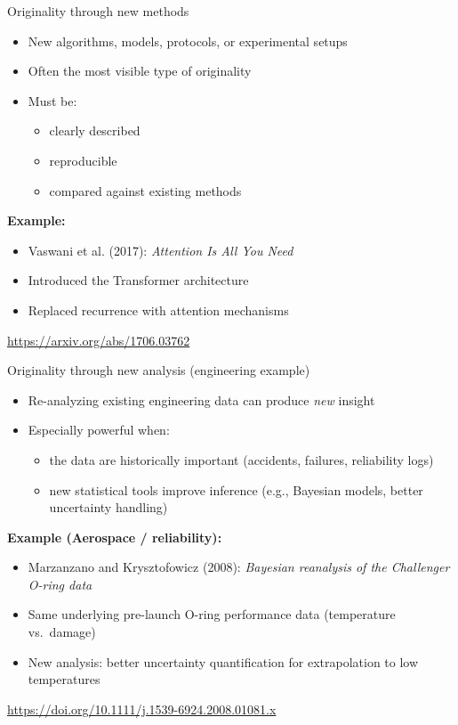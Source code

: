 \documentclass[aspectratio=169]{beamer}
\begin{document}
\begin{frame}{Originality through new methods}
  \begin{itemize}
    \item New algorithms, models, protocols, or experimental setups
    \item Often the most visible type of originality
    \item Must be:
      \begin{itemize}
        \item clearly described
        \item reproducible
        \item compared against existing methods
      \end{itemize}
  \end{itemize}

  \vspace{0.5em}
  \textbf{Example:}
  \begin{itemize}
    \item Vaswani et al. (2017): \emph{Attention Is All You Need}
    \item Introduced the Transformer architecture
    \item Replaced recurrence with attention mechanisms
  \end{itemize}

  \vspace{0.3em}
  \tiny
  \url{https://arxiv.org/abs/1706.03762}
\end{frame}

\begin{frame}{Originality through new analysis (engineering example)}
  \begin{itemize}
    \item Re-analyzing existing engineering data can produce \emph{new} insight
    \item Especially powerful when:
      \begin{itemize}
        \item the data are historically important (accidents, failures, reliability logs)
        \item new statistical tools improve inference (e.g., Bayesian models, better uncertainty handling)
      \end{itemize}
  \end{itemize}

  \vspace{0.5em}
  \textbf{Example (Aerospace / reliability):}
  \begin{itemize}
    \item Marzanzano and Krysztofowicz (2008): \emph{Bayesian reanalysis of the Challenger O-ring data}
    \item Same underlying pre-launch O-ring performance data (temperature vs.\ damage)
    \item New analysis: better uncertainty quantification for extrapolation to low temperatures
  \end{itemize}

  \vspace{0.3em}
    \tiny
  \url{ https://doi.org/10.1111/j.1539-6924.2008.01081.x}

\end{frame}
\end{document}
